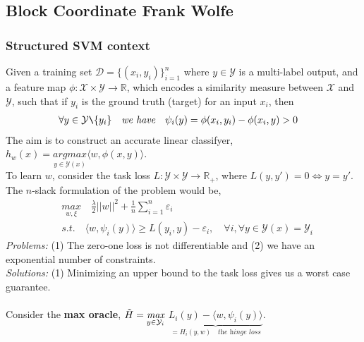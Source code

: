 \documentclass{article}
\begin{document}
\subsection{Block Coordinate Frank Wolfe}
\subsubsection{Structured SVM context}
Given a training set $\mathcal{D}=\{(x_i,y_i)\}_{i=1}^n$ where $y \in \mathcal{Y}$ is a multi-label output, and a feature map $\phi:\mathcal{X}\times\mathcal{Y}\longrightarrow \mathbb{R}$, which encodes a similarity measure between $\mathcal{X}$ and $\mathcal{Y}$, such that if $y_{i}$ is the ground truth (target) for an input $x_{i}$, then
\begin{equation*}
\begin{aligned}
    &\forall y\in\mathcal{Y}\texttt{\symbol{92}}\{y_{i}\}\quad\textit{we have}\quad \psi_{i}(y) = \phi(x_{i},y_{i})- \phi(x_{i},y) > 0
\end{aligned}
\end{equation*}
The aim is to construct an accurate linear classifyer, $h_{w}(x)= \underset{y\in\mathcal{Y}(x)}{\textit{argmax}}\langle w, \phi(x,y)\rangle$.\\
To learn $w$, consider the task loss $L:\mathcal{Y}\times\mathcal{Y}\longrightarrow\mathbb{R}_{+}$, where $L(y,y\prime)= 0 \Longleftrightarrow y= y\prime$.
\\
The $n$-slack formulation of the problem would be,
\begin{equation*}
\begin{aligned}
    &\underset{w,\xi}{\textit{max}}\quad\frac{\lambda}{2}||w||^{2}+ \frac{1}{n}\sum_{i=1}^{n}\varepsilon_{i}\\
    &\textit{s.t.}\quad \langle w, \psi_{i}(y)\rangle \geq L(y_{i},y)- \varepsilon_{i},\quad\forall i ,\forall y\in\mathcal{Y}(x)=\mathcal{Y}_{i}
\end{aligned}
\end{equation*}
\textit{Problems:} (1) The zero-one loss is not differentiable and (2) we have an exponential number of constraints.\\
\textit{Solutions:} (1) Minimizing an upper bound to the task loss gives us a worst case guarantee.
\\
\\
Consider the \textbf{max oracle}, $\Tilde{H}= \underset{y\in\mathcal{Y}_{i}}{\textit{max}}$ $\underbrace{L_{i}(y)- \langle w, \psi_{i}(y)\rangle}_{= H_{i}(y,w)\quad\textit{the hinge loss}}$.\\
\end{document}
